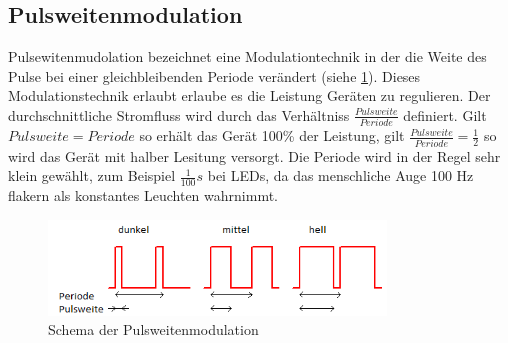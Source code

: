 \subsection{Pulsweitenmodulation}\label{sec_pulsweitenmodulation}
Pulsewitenmudolation bezeichnet eine Modulationtechnik in der die Weite des
Pulse bei einer gleichbleibenden Periode verändert (siehe \ref{pwm_schma}).
Dieses Modulationstechnik erlaubt erlaube es die Leistung Geräten zu regulieren.
Der durchschnittliche Stromfluss wird durch das Verhältniss
$\frac{Pulsweite}{Periode}$ definiert. Gilt $Pulsweite=Periode$ so erhält das
Gerät 100\% der Leistung, gilt $\frac{Pulsweite}{Periode}=\frac{1}{2}$ so wird das Gerät mit halber Lesitung
versorgt.
Die Periode wird in der Regel sehr klein gewählt, zum Beispiel $\frac{1}{100}s$
bei LEDs, da das menschliche Auge 100 Hz flakern als konstantes Leuchten
wahrnimmt.
\begin{figure}[h]
  \begin{center}
    \includegraphics[width=0.8\textwidth]{skizzen/pwm.png}
  \end{center}
  \caption{Schema der Pulsweitenmodulation}
  \label{pwm_schma}
\end{figure}


